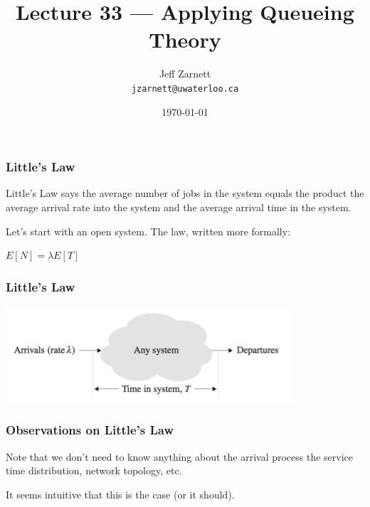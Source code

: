 

\title{Lecture 33 --- Applying Queueing Theory}

\author{Jeff Zarnett\\ \small \texttt{jzarnett@uwaterloo.ca}}
\date{\today}




\begin{frame}
  \titlepage

 \end{frame}




\begin{frame}
\frametitle{Little's Law}

Little's Law says the average number of jobs in the system equals the product the average arrival rate into the system and the average arrival time in the system. 

Let's start with an open system. The law, written more formally:

\begin{center}
	$E[N] = \lambda E[T]$
\end{center}

\end{frame}



\begin{frame}
\frametitle{Little's Law}

\begin{center}
	\includegraphics[width=0.8\textwidth]{images/littleslaw.png}
\end{center}

\end{frame}



\begin{frame}
\frametitle{Observations on Little's Law}

Note that we don't need to know anything about the arrival process the service time distribution, network topology, etc. 

It seems intuitive that this is the case (or it should). 

\end{frame}



